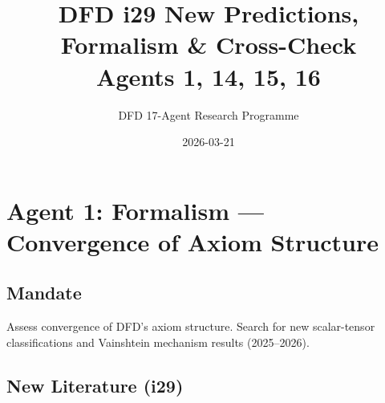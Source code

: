 \documentclass[11pt,a4paper]{article}
\title{DFD i29 New Predictions, Formalism \& Cross-Check\\Agents 1, 14, 15, 16}
\author{DFD 17-Agent Research Programme}
\date{2026-03-21}
\begin{document}
\maketitle
\tableofcontents
\newpage

\section{Agent 1: Formalism --- Convergence of Axiom Structure}

\subsection{Mandate}
Assess convergence of DFD's axiom structure. Search for new scalar-tensor classifications and Vainshtein mechanism results (2025--2026).

\subsection{New Literature (i29)}
\end{document}

